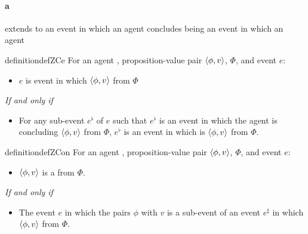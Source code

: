 \paragraph{ a }

\begin{note}
   extends to an event in which an agent concludes being an event in which an agent 

  \begin{restatable}[\sCe{2}]{definition}{defZCe}
    \label{def:sCe}
    For an agent \vAgent{}, proposition-value pair \(\langle \phi, v \rangle\), \poP{} \(\Phi\), and event \(e\):

    \begin{itemize}
    \item
      \(e\) is event in which \vAgent{} \emph{\sCe{}} \(\langle \phi, v \rangle\) from \(\Phi\)
    \end{itemize}

    \emph{If and only if}

    \begin{itemize}
    \item
      For any sub-event \(e^{\flat}\) of \(e\) such that \(e^{\flat}\) is an event in which the agent is concluding \(\langle \phi, v \rangle\) from \(\Phi\), \(e^{\flat}\) is an event in which \vAgent{} is \sCing{} \(\langle \phi, v \rangle\) from \(\Phi\).
    \end{itemize}
    \vspace{-\baselineskip}
  \end{restatable}

    \begin{restatable}[\sCon{2}]{definition}{defZCon}
    \label{def:sCon}
    For an agent \vAgent{}, proposition-value pair \(\langle \phi, v \rangle\), \poP{} \(\Phi\), and event \(e\):

    \begin{itemize}
    \item
      \(\langle \phi, v \rangle\) is a \emph{\sCon{}} from \(\Phi\).
    \end{itemize}

    \emph{If and only if}

    \begin{itemize}
    \item
      The event \(e\) in which the \vAgent{} pairs \(\phi\) with \(v\) is a sub-event of an event \(e^{\sharp}\) in which \vAgent{}  \(\langle \phi, v \rangle\) from \(\Phi\).
    \end{itemize}
    \vspace{-\baselineskip}
  \end{restatable}
\end{note}

